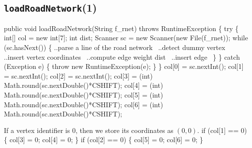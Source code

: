 \documentclass{article}
\def\nwendcode{\endtrivlist \endgroup}      %
\let\nwdocspar=\par
\begin{document}
\subsection{{\tt{}\protect{}loadRoadNetwork}(1)}
\nwenddocs{}\endmoddef{}
public void loadRoadNetwork(String f_rnet) throws RuntimeException \{
  try \{
    int[] col = new int[7];
    int dist;
    Scanner sc = new Scanner(new File(f_rnet));
    while (sc.hasNext()) \{
      \LA{}..parse a line of the road network~{\nwtagstyle{}}\RA{}
      \LA{}..detect dummy vertex~{\nwtagstyle{}}\RA{}
      \LA{}..insert vertex coordinates~{\nwtagstyle{}}\RA{}
      \LA{}..compute edge weight \code{}dist\edoc{}~{\nwtagstyle{}}\RA{}
      \LA{}..insert edge~{\nwtagstyle{}}\RA{}
    \}
  \} catch (Exception e) \{
    throw new RuntimeException(e);
  \}
\}
\eatline
{}\nwendcode{}\endmoddef{}
col[0] = sc.nextInt();
col[1] = sc.nextInt();
col[2] = sc.nextInt();
col[3] = (int) Math.round(sc.nextDouble()*CSHIFT);
col[4] = (int) Math.round(sc.nextDouble()*CSHIFT);
col[5] = (int) Math.round(sc.nextDouble()*CSHIFT);
col[6] = (int) Math.round(sc.nextDouble()*CSHIFT);
\nwendcode{}\nwdocspar
If a vertex identifier is $0$, then we store its coordinates as $(0,0)$.
\nwenddocs{}\endmoddef{}
if (col[1] == 0) \{
  col[3] = 0;
  col[4] = 0;
\}
if (col[2] == 0) \{
  col[5] = 0;
  col[6] = 0;
\}
\nwendcode{}\nwdocspar
\nwenddocs{}\endmoddef{}
\end{document}
